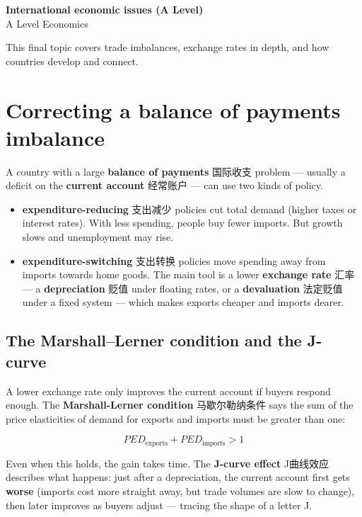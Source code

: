 \documentclass[11pt]{article}
\begin{document}
\begin{center}
  {\LARGE\bfseries International economic issues (A Level)}\\[0.35em]
  {\large A Level Economics}
\end{center}
\vspace{0.6em}

This final topic covers trade imbalances, exchange rates in depth, and how countries develop and connect.

\section*{Correcting a balance of payments imbalance}

A country with a large \textbf{balance of payments} 国际收支 problem — usually a deficit on the \textbf{current account} 经常账户 — can use two kinds of policy.

\begin{itemize}
\item \textbf{expenditure-reducing} 支出减少 policies cut total demand (higher taxes or interest rates). With less spending, people buy fewer imports. But growth slows and unemployment may rise.

\item \textbf{expenditure-switching} 支出转换 policies move spending away from imports towards home goods. The main tool is a lower \textbf{exchange rate} 汇率 — a \textbf{depreciation} 贬值 under floating rates, or a \textbf{devaluation} 法定贬值 under a fixed system — which makes exports cheaper and imports dearer.

\end{itemize}

\subsection*{The Marshall–Lerner condition and the J-curve}

A lower exchange rate only improves the current account if buyers respond enough. The \textbf{Marshall-Lerner condition} 马歇尔勒纳条件 says the sum of the price elasticities of demand for exports and imports must be greater than one:

\[
PED_{\text{exports}} + PED_{\text{imports}} > 1
\]

Even when this holds, the gain takes time. The \textbf{J-curve effect} J曲线效应 describes what happens: just after a depreciation, the current account first gets \textbf{worse} (imports cost more straight away, but trade volumes are slow to change), then later improves as buyers adjust — tracing the shape of a letter J.
\end{document}
